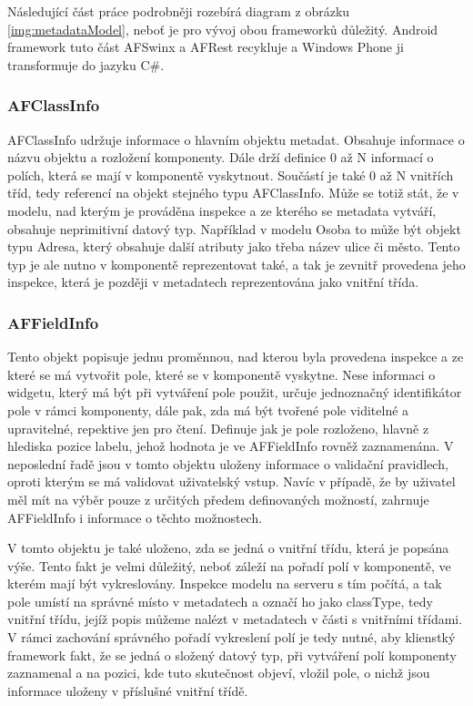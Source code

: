 Následující část práce podrobněji rozebírá diagram z obrázku \ref{img:metadataModel}, neboť je pro vývoj obou frameworků důležitý. Android framework tuto část AFSwinx a AFRest recykluje a Windows Phone ji transformuje do jazyku C\#.
\subsubsection{AFClassInfo}
AFClassInfo udržuje informace o hlavním objektu metadat. Obsahuje informace o názvu objektu a rozložení komponenty. Dále drží definice 0 až N informací o polích, která se mají v komponentě vyskytnout. Součástí je také 0 až N vnitřích tříd, tedy referencí na objekt stejného typu AFClassInfo. Může se totiž stát, že v modelu, nad kterým je prováděna inspekce a ze kterého se metadata vytváří, obsahuje neprimitivní datový typ. Například v modelu Osoba to může být objekt typu Adresa, který obsahuje další atributy jako třeba název ulice či město. Tento typ je ale nutno v komponentě reprezentovat také, a tak je zevnitř provedena jeho inspekce, která je později v metadatech reprezentována jako vnitřní třída. 

\subsubsection{AFFieldInfo}
Tento objekt popisuje jednu proměnnou, nad kterou byla provedena inspekce a ze které se má vytvořit pole, které se v komponentě vyskytne. Nese informaci o widgetu, který má být při vytváření pole použit, určuje jednoznačný identifikátor pole v rámci komponenty, dále pak, zda má být tvořené pole viditelné a upravitelné, repektive jen pro čtení. Definuje jak je pole rozloženo, hlavně z hlediska pozice labelu, jehož hodnota je ve AFFieldInfo rovněž zaznamenána. V neposlední řadě jsou v tomto objektu uloženy informace o validační pravidlech, oproti kterým se má validovat uživatelský vstup. Navíc v případě, že by uživatel měl mít na výběr pouze z určitých předem definovaných možností, zahrnuje AFFieldInfo i informace o těchto možnostech. 

V tomto objektu je také uloženo, zda se jedná o vnitřní třídu, která je popsána výše. Tento fakt je velmi důležitý, neboť záleží na pořadí polí v komponentě, ve kterém mají být vykreslovány. Inspekce modelu na serveru s tím počítá, a tak pole umístí na správné místo v metadatech a označí ho jako classType, tedy vnitřní třídu, jejíž popis můžeme nalézt v metadatech v části s vnitřními třídami. V rámci zachování správného pořadí vykreslení polí je tedy nutné, aby klienstký framework fakt, že se jedná o složený datový typ, při vytváření polí komponenty zaznamenal a na pozici, kde tuto skutečnost objeví, vložil pole, o nichž jsou informace uloženy v příslušné vnitřní třídě.

